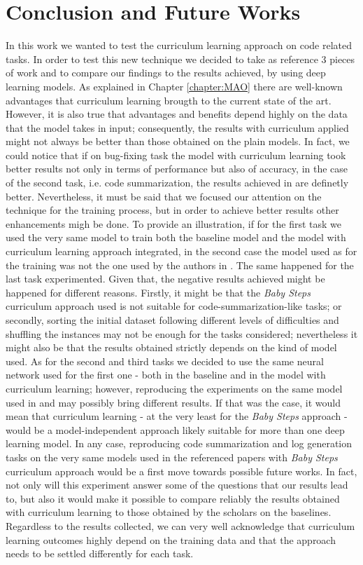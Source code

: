 \chapter{Conclusion and Future Works}
In this work we wanted to test the curriculum learning approach on code related tasks.
In order to test this new technique we decided to take as reference 3 pieces of work and to compare 
our findings to the results achieved, by using deep learning models.
As explained in Chapter \ref{chapter:MAO} there are well-known advantages that curriculum learning
brougth to the current state of the art. However, it is also true that advantages and benefits depend highly on the data 
that the model takes in input; consequently, the results with curriculum applied might not always be better than 
those obtained on the plain models. 
In fact, we could notice that if on bug-fixing task the model with curriculum learning 
took better results not only in terms of performance but also of accuracy, 
in the case of the second task, i.e. code summarization, the results achieved in \cite{Leclair2020}
are definetly better.
Nevertheless, it must be said that we focused our attention on the technique for the training process, but in order to achieve better 
results other enhancements migh be done. To provide an illustration, if for the first task we used the very same model 
to train both the baseline model and the model with curriculum learning approach integrated, in the second case the model used as for the training was not the 
one used by the authors in \cite{Leclair2020}. The same happened for the last task experimented. 
Given that, the negative results achieved might be happened for different reasons.
Firstly, it might be that 
the \textit{Baby Steps} curriculum approach used is not suitable for code-summarization-like tasks; 
or secondly, sorting the initial dataset following different levels 
of difficulties and shuffling the instances may not be enough for the tasks considered; nevertheless it might also be that the results obtained 
strictly depends on the kind of model used. As for the second and third tasks we decided to use the same neural network used 
for the first one - both in the baseline and in the model with curriculum learning; however, 
reproducing the experiments on the same model used in \cite{Leclair2020} and \cite{Mastropaolo2022} may possibly bring different results.
If that was the case, it would mean that curriculum learning - at the very least for the \textit{Baby Steps} approach - 
would be a model-independent approach likely suitable for more than one deep learning model.
In any case, reproducing code summarization and log generation tasks on the very same models used in the referenced papers with
\textit{Baby Steps} curriculum approach would be a first move towards possible future works. In fact, not only will this experiment answer 
some of the questions that our results lead to, but also it would make it possible to compare reliably the results obtained with curriculum 
learning to those obtained by the scholars on the baselines.
Regardless to the results collected, we can very well acknowledge that curriculum learning outcomes highly depend on the training data and that the 
approach needs to be settled differently for each task.


